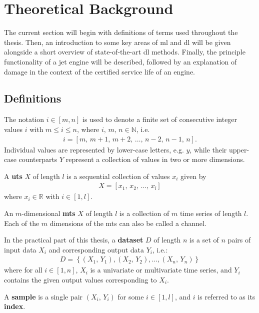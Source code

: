 \chapter{Theoretical Background} \label{sec:theory}
The current section will begin with definitions of terms used throughout the thesis. Then, an introduction to some key areas of \ac{ml} and \ac{dl} will be given alongside a short overview of state-of-the-art \ac{dl} methods. Finally, the principle functionality of a jet engine will be described, followed by an explanation of damage in the context of the certified service life of an engine.

\section{Definitions}
The notation \(i \in \left[m, n\right]\) is used to denote a finite set of consecutive integer values \(i\) with \(m \leq i \leq n\), where \(i,\,m,\,n \in \mathbb{N}\), i.e.
\begin{align}
    i = \left[m,\,m+1,\,m+2,\,\ldots,\,n-2,\,n-1,\,n\right].
\end{align}
Individual values are represented by lower-case letters, e.g. \(y\), while their upper-case counterparts \(Y\) represent a collection of values in two or more dimensions.

A \textbf{\ac{uts}} \(X\) of length \(l\) is a sequential collection of values \(x_{i}\) given by
\begin{align}
    X = \left[x_{1},\,x_{2},\,\ldots,\,x_{l}\right]
\end{align}
where \(x_{i} \in \mathbb{R}\) with \(i \in \left[1, l\right]\).

An \(m\)-dimensional \textbf{\ac{mts}} \(X\) of length \(l\) is a collection of \(m\) time series of length \(l\). Each of the \(m\) dimensions of the \ac{mts} can also be called a channel.
\cite[]{ismail_fawaz_deep_2019}

In the practical part of this thesis, a \textbf{dataset} \(D\) of length \(n\) is a set of \(n\) pairs of input data \(X_i\) and corresponding output data \(Y_i\), i.e.:
\begin{align}
    D = \left\{\left(X_1,\,Y_1\right), \left(X_2,\,Y_2\right), \ldots, \left(X_n,\,Y_n\right)\right\}
\end{align}
where for all \(i \in \left[1, n\right]\), \(X_i\) is a univariate or multivariate time series, and \(Y_i\) contains the given output values corresponding to \(X_i\).

A \textbf{sample} is a single pair \(\left(X_i,\,Y_i\right)\) for some \(i \in \left[1, l\right]\), and \(i\) is referred to as its \textbf{index}.

